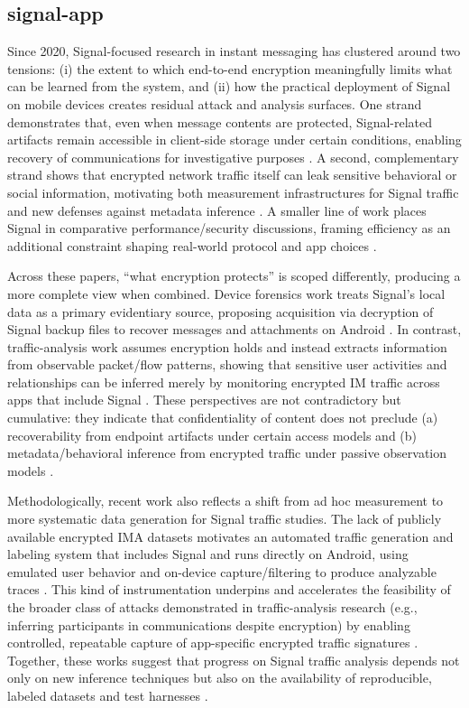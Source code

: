 \subsection{signal-app}
Since 2020, Signal-focused research in instant messaging has clustered around two tensions: (i) the extent to which end-to-end encryption meaningfully limits what can be learned from the system, and (ii) how the practical deployment of Signal on mobile devices creates residual attack and analysis surfaces. One strand demonstrates that, even when message contents are protected, Signal-related artifacts remain accessible in client-side storage under certain conditions, enabling recovery of communications for investigative purposes \cite{krishnapriya2021}. A second, complementary strand shows that encrypted network traffic itself can leak sensitive behavioral or social information, motivating both measurement infrastructures for Signal traffic and new defenses against metadata inference \cite{erdenebaatar2023,bozorgi2023,brigham2025}. A smaller line of work places Signal in comparative performance/security discussions, framing efficiency as an additional constraint shaping real-world protocol and app choices \cite{thapa2025}.

Across these papers, “what encryption protects” is scoped differently, producing a more complete view when combined. Device forensics work treats Signal’s local data as a primary evidentiary source, proposing acquisition via decryption of Signal backup files to recover messages and attachments on Android \cite{krishnapriya2021}. In contrast, traffic-analysis work assumes encryption holds and instead extracts information from observable packet/flow patterns, showing that sensitive user activities and relationships can be inferred merely by monitoring encrypted IM traffic across apps that include Signal \cite{bozorgi2023}. These perspectives are not contradictory but cumulative: they indicate that confidentiality of content does not preclude (a) recoverability from endpoint artifacts under certain access models \cite{krishnapriya2021} and (b) metadata/behavioral inference from encrypted traffic under passive observation models \cite{bozorgi2023}.

Methodologically, recent work also reflects a shift from ad hoc measurement to more systematic data generation for Signal traffic studies. The lack of publicly available encrypted IMA datasets motivates an automated traffic generation and labeling system that includes Signal and runs directly on Android, using emulated user behavior and on-device capture/filtering to produce analyzable traces \cite{erdenebaatar2023}. This kind of instrumentation underpins and accelerates the feasibility of the broader class of attacks demonstrated in traffic-analysis research (e.g., inferring participants in communications despite encryption) by enabling controlled, repeatable capture of app-specific encrypted traffic signatures \cite{erdenebaatar2023,bozorgi2023}. Together, these works suggest that progress on Signal traffic analysis depends not only on new inference techniques but also on the availability of reproducible, labeled datasets and test harnesses \cite{erdenebaatar2023,bozorgi2023}.

